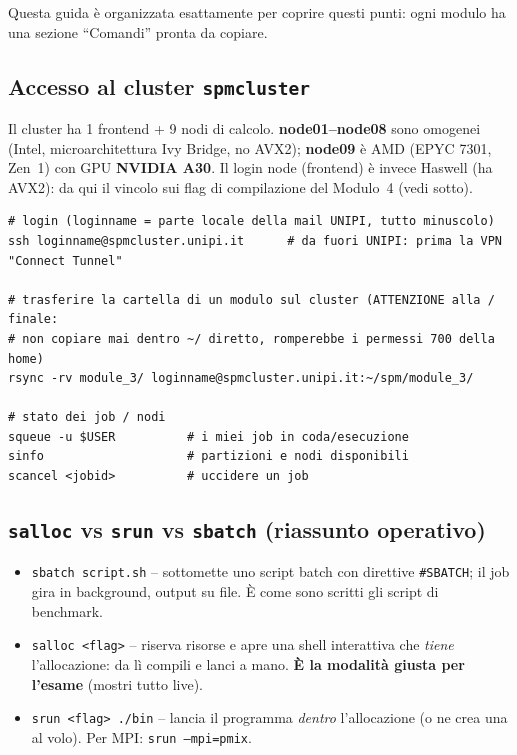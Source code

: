 \documentclass[11pt,a4paper]{article}
\begin{document}
Questa guida è organizzata esattamente per coprire questi punti: ogni modulo ha una sezione ``Comandi'' pronta da copiare.

\subsection{Accesso al cluster \texttt{spmcluster}}

Il cluster ha 1 frontend + 9 nodi di calcolo. \textbf{node01--node08} sono omogenei (Intel, microarchitettura Ivy Bridge, no AVX2); \textbf{node09} è AMD (EPYC 7301, Zen~1) con GPU \textbf{NVIDIA A30}. Il login node (frontend) è invece Haswell (ha AVX2): da qui il vincolo sui flag di compilazione del Modulo~4 (vedi sotto).

\begin{lstlisting}[style=bash, caption={Accesso, trasferimento file, comandi SLURM di base.}]
# login (loginname = parte locale della mail UNIPI, tutto minuscolo)
ssh loginname@spmcluster.unipi.it      # da fuori UNIPI: prima la VPN "Connect Tunnel"

# trasferire la cartella di un modulo sul cluster (ATTENZIONE alla / finale:
# non copiare mai dentro ~/ diretto, romperebbe i permessi 700 della home)
rsync -rv module_3/ loginname@spmcluster.unipi.it:~/spm/module_3/

# stato dei job / nodi
squeue -u $USER          # i miei job in coda/esecuzione
sinfo                    # partizioni e nodi disponibili
scancel <jobid>          # uccidere un job
\end{lstlisting}

\subsection{\texttt{salloc} vs \texttt{srun} vs \texttt{sbatch} (riassunto operativo)}

\begin{itemize}
  \item \texttt{sbatch script.sh} -- sottomette uno script batch con direttive \texttt{\#SBATCH}; il job gira in background, output su file. È come sono scritti gli script di benchmark.
  \item \texttt{salloc <flag>} -- riserva risorse e apre una shell interattiva che \emph{tiene} l'allocazione: da lì compili e lanci a mano. \textbf{È la modalità giusta per l'esame} (mostri tutto live).
  \item \texttt{srun <flag> ./bin} -- lancia il programma \emph{dentro} l'allocazione (o ne crea una al volo). Per MPI: \texttt{srun --mpi=pmix}.
\end{itemize}
\end{document}
